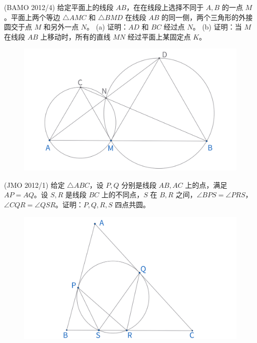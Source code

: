 \newpage 
\begin{exercise}
    (BAMO 2012/4) 给定平面上的线段 ${AB}$，在在线段上选择不同于 $A, B$ 的一点 $M$。平面上两个等边 $\triangle AMC$ 和 $\triangle BMD$ 在线段 ${AB}$ 的同一侧，两个三角形的外接圆交于点 $M$ 和另外一点 $N$。
(a) 证明：${AD}$ 和 ${BC}$ 经过点 $N$。
(b) 证明：当 $M$ 在线段 ${AB}$ 上移动时，所有的直线 $MN$ 经过平面上某固定点 $K$。
\end{exercise}
\begin{figure}[H]
    \centering
    \includegraphics[width=0.7\linewidth]{figures/exercises/227.png}
\end{figure}


\begin{exercise}
    (JMO 2012/1) 给定 $\triangle ABC$，设 $P, Q$ 分别是线段 ${AB}, {AC}$ 上的点，满足 $AP = AQ$。设 $S, R$ 是线段 ${BC}$ 上的不同点，$S$ 在 $B, R$ 之间，$\angle BPS = \angle PRS$，$\angle CQR = \angle QSR$。证明：$P, Q, R, S$ 四点共圆。
\end{exercise}
\begin{figure}[H]
    \centering
    \includegraphics[width=0.7\linewidth]{figures/exercises/228.png}
\end{figure}

